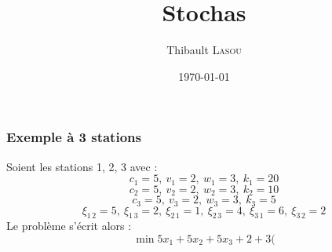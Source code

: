 \documentclass{report}
\title{Stochas}\let\mytitle\thetitle
\author{Thibault \textsc{Lasou}}
\date\today
\begin{document}
\pagestyle{polytech}
\renewcommand{\chaptermark}[1]{%
	\markboth{\textsc{\chaptername
}\ \thechapter\\#1}{}}
\part*{\mytitle}
\section{Exemple à 3 stations}
Soient les stations 1, 2, 3 avec :
$$c_1 = 5,\ v_1=2,\ w_1=3,\ k_1 = 20$$
$$c_2 = 5,\ v_2=2,\ w_2=3,\ k_2 = 10$$
$$c_3 = 5,\ v_3=2,\ w_3=3,\ k_3 = 5$$
$$\xi_{1\,2} = 5,\ \xi_{1\,3} = 2,\ \xi_{2\,1} = 1,\ \xi_{2\,3} = 4,\ \xi_{3\,1} = 6,\ \xi_{3\,2} = 2$$ 
Le problème s'écrit alors :
$$\min  5x_1+5x_2+5x_3+2+3($$
\end{document}
